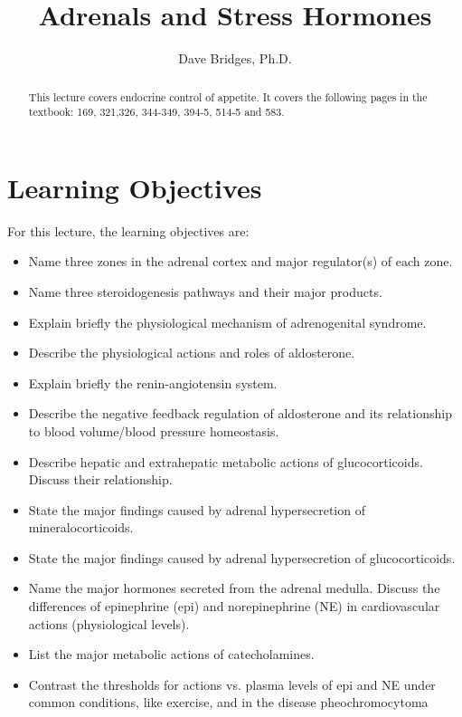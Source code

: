 \documentclass{tufte-handout}
\title{Adrenals and Stress Hormones}
\author{Dave Bridges, Ph.D.}
\begin{document}
\maketitle%

\begin{abstract}
\noindent This lecture covers endocrine control of appetite.  It covers the following pages in the textbook: 169, 321,326, 344-349, 394-5, 514-5 and 583\cite{Widmaier2013}.
\end{abstract}

\tableofcontents

\pagebreak

\section{Learning Objectives}
For this lecture, the learning objectives are:
\begin{itemize}
\item Name three zones in the adrenal cortex and major regulator(s) of each zone.
\item Name three steroidogenesis pathways and their major products.
\item Explain briefly the physiological mechanism of adrenogenital syndrome.
\item Describe the physiological actions and roles of aldosterone.
\item Explain briefly the renin-angiotensin system.
\item Describe the negative feedback regulation of aldosterone and its relationship to blood volume/blood pressure homeostasis.
\item Describe hepatic and extrahepatic metabolic actions of glucocorticoids. Discuss their relationship.
\item State the major findings caused by adrenal hypersecretion of mineralocorticoids.
\item State the major findings caused by adrenal hypersecretion of glucocorticoids.
\item Name the major hormones secreted from the adrenal medulla. Discuss the differences of epinephrine (epi) and norepinephrine (NE) in cardiovascular actions (physiological levels). 
\item List the major metabolic actions of catecholamines.
\item Contrast the thresholds for actions vs. plasma levels of epi and NE under common conditions, like exercise, and in the disease pheochromocytoma

\end{itemize}
\end{document}

